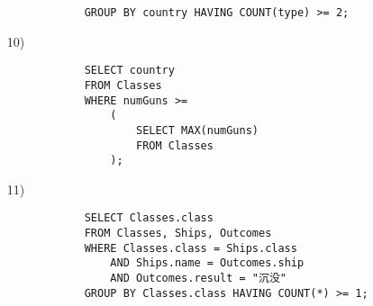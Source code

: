 \documentclass[10pt,a4paper]{article}
\begin{document}
\begin{enumerate}
\begin{verbatim}
            GROUP BY country HAVING COUNT(type) >= 2;
        \end{verbatim}
        \item[10)]\begin{verbatim}
            SELECT country
            FROM Classes
            WHERE numGuns >=
                (
                    SELECT MAX(numGuns)
                    FROM Classes
                );
        \end{verbatim}
        \item[11)]\begin{verbatim}
            SELECT Classes.class
            FROM Classes, Ships, Outcomes
            WHERE Classes.class = Ships.class
                AND Ships.name = Outcomes.ship
                AND Outcomes.result = "沉没"
            GROUP BY Classes.class HAVING COUNT(*) >= 1;
        \end{verbatim}
    \end{enumerate}
\end{document}

